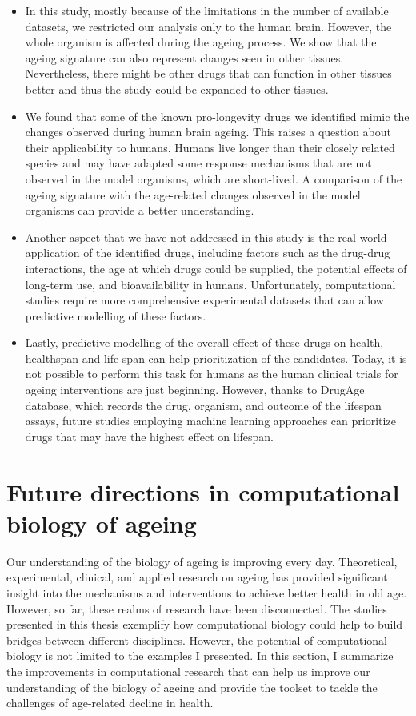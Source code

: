 \documentclass[12pt,twoside]{unicam}
\providecommand{\tightlist}{%
  \setlength{\itemsep}{0pt}\setlength{\parskip}{0pt}}
\begin{document}
\begin{itemize}
\tightlist
\item
  In this study, mostly because of the limitations in the number of available datasets, we restricted our analysis only to the human brain. However, the whole organism is affected during the ageing process. We show that the ageing signature can also represent changes seen in other tissues. Nevertheless, there might be other drugs that can function in other tissues better and thus the study could be expanded to other tissues.
\item
  We found that some of the known pro-longevity drugs we identified mimic the changes observed during human brain ageing. This raises a question about their applicability to humans. Humans live longer than their closely related species and may have adapted some response mechanisms that are not observed in the model organisms, which are short-lived. A comparison of the ageing signature with the age-related changes observed in the model organisms can provide a better understanding.
\item
  Another aspect that we have not addressed in this study is the real-world application of the identified drugs, including factors such as the drug-drug interactions, the age at which drugs could be supplied, the potential effects of long-term use, and bioavailability in humans. Unfortunately, computational studies require more comprehensive experimental datasets that can allow predictive modelling of these factors.
\item
  Lastly, predictive modelling of the overall effect of these drugs on health, healthspan and life-span can help prioritization of the candidates. Today, it is not possible to perform this task for humans as the human clinical trials for ageing interventions are just beginning. However, thanks to DrugAge database, which records the drug, organism, and outcome of the lifespan assays, future studies employing machine learning approaches can prioritize drugs that may have the highest effect on lifespan.
\end{itemize}

\hypertarget{future-directions-in-computational-biology-of-ageing}{%
\section{Future directions in computational biology of ageing}\label{future-directions-in-computational-biology-of-ageing}}

Our understanding of the biology of ageing is improving every day. Theoretical, experimental, clinical, and applied research on ageing has provided significant insight into the mechanisms and interventions to achieve better health in old age. However, so far, these realms of research have been disconnected. The studies presented in this thesis exemplify how computational biology could help to build bridges between different disciplines. However, the potential of computational biology is not limited to the examples I presented. In this section, I summarize the improvements in computational research that can help us improve our understanding of the biology of ageing and provide the toolset to tackle the challenges of age-related decline in health.
\end{document}

